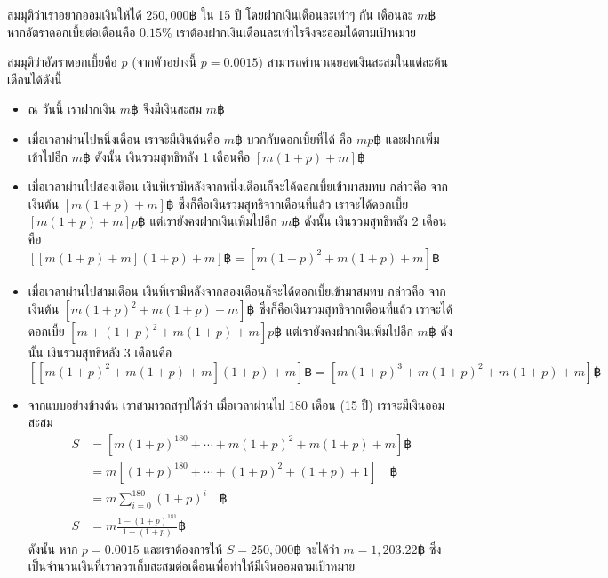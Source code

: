 \begin{example}
สมมุติว่าเราอยากออมเงินให้ได้ $250{,}000฿$ ใน 15 ปี โดยฝากเงินเดือนละเท่าๆ กัน เดือนละ $m฿$ \enskip หากอัตราดอกเบี้ยต่อเดือนคือ $0.15\%$ เราต้องฝากเงินเดือนละเท่าไรจึงจะออมได้ตามเป้าหมาย

สมมุติว่าอัตราดอกเบี้ยคือ $p$ (จากตัวอย่างนี้ $p=0.0015$) สามารถคำนวณยอดเงินสะสมในแต่ละต้นเดือนได้ดังนี้
\begin{itemize}
\item ณ วันนี้ เราฝากเงิน $m฿$ จึงมีเงินสะสม $m฿$
\item เมื่อเวลาผ่านไปหนึ่งเดือน เราจะมีเงินต้นคือ $m฿$ บวกกับดอกเบี้ยที่ได้ คือ $mp฿$ และฝากเพิ่มเข้าไปอีก $m฿$ \enskip ดังนั้น เงินรวมสุทธิหลัง 1 เดือนคือ $[m(1+p)+m]฿$
\item เมื่อเวลาผ่านไปสองเดือน เงินที่เรามีหลังจากหนึ่งเดือนก็จะได้ดอกเบี้ยเข้ามาสมทบ กล่าวคือ จากเงินต้น $[m(1+p)+m]฿$ ซึ่งก็คือเงินรวมสุทธิจากเดือนที่แล้ว เราจะได้ดอกเบี้ย $[m(1+p)+m]p฿$ แต่เรายังคงฝากเงินเพิ่มไปอีก $m฿$ \enskip ดังนั้น เงินรวมสุทธิหลัง 2 เดือนคือ $[[m(1+p)+m](1+p)+m]฿=[m(1+p)^2+m(1+p)+m]฿$
\item เมื่อเวลาผ่านไปสามเดือน เงินที่เรามีหลังจากสองเดือนก็จะได้ดอกเบี้ยเข้ามาสมทบ กล่าวคือ จากเงินต้น $[m(1+p)^2+m(1+p)+m]฿$ ซึ่งก็คือเงินรวมสุทธิจากเดือนที่แล้ว เราจะได้ดอกเบี้ย $[m+(1+p)^2+m(1+p)+m]p฿$ แต่เรายังคงฝากเงินเพิ่มไปอีก $m฿$ \enskip ดังนั้น เงินรวมสุทธิหลัง 3 เดือนคือ $[[m(1+p)^2+m(1+p)+m](1+p)+m]฿=[m(1+p)^3+m(1+p)^2+m(1+p)+m]฿$
\item จากแบบอย่างข้างต้น เราสามารถสรุปได้ว่า เมื่อเวลาผ่านไป 180 เดือน (15 ปี) เราจะมีเงินออมสะสม
\begin{align*}
S
&=[m(1+p)^{180}+\cdots+m(1+p)^2+m(1+p)+m]฿ \\
&=m\left[(1+p)^{180}+\cdots+(1+p)^2+(1+p)+1\right] \quad ฿ \\
&=m\sum_{i=0}^{180}{(1+p)^i} \quad ฿ \\
S &=m\frac{1-(1+p)^{181}}{1-(1+p)}฿
\end{align*}
ดังนั้น หาก $p=0.0015$ และเราต้องการให้ $S=250{,}000฿$ จะได้ว่า $m=1{,}203.22฿$ ซึ่งเป็นจำนวนเงินที่เราควรเก็บสะสมต่อเดือนเพื่อทำให้มีเงินออมตามเป้าหมาย
\end{itemize}
\end{example}
